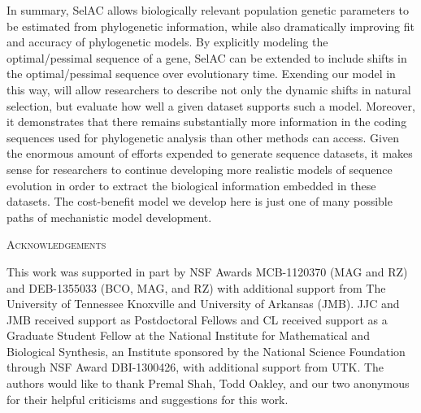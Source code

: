 \documentclass[12pt,letterpaper]{article}
\renewcommand{\section}[1]{%
\bigskip
\begin{center}
\begin{Large}
\normalfont\scshape #1
\medskip
\end{Large}
\end{center}}
\newcommand{\PC}{physico-chemical\xspace}
\newcommand{\selac}{SelAC\xspace}
\begin{document}

 

In summary, \selac allows biologically relevant population genetic parameters to be estimated from phylogenetic information, while also dramatically improving fit and accuracy of phylogenetic models. 
By explicitly modeling the optimal/pessimal sequence of a gene, \selac can be extended to include shifts in the optimal/pessimal sequence over evolutionary time.
Exending our model in this way, will allow researchers to describe not only the dynamic shifts in natural selection, but evaluate how well a given dataset supports such a model.
Moreover, it demonstrates that there remains substantially more information in the coding sequences used for phylogenetic analysis than other methods can access. 
Given the enormous amount of efforts expended to generate sequence datasets, it makes sense for researchers to continue developing more realistic models of sequence evolution in order to extract the biological information embedded in these datasets. 
The cost-benefit model we develop here is just one of many possible paths of mechanistic model development.






\section{Acknowledgements}
This work was supported in part by NSF Awards MCB-1120370 (MAG and RZ) and DEB-1355033 (BCO, MAG, and RZ) with additional support from The University of Tennessee Knoxville and University of Arkansas (JMB).
JJC and JMB received support as Postdoctoral Fellows and CL received support as a Graduate Student Fellow at the National Institute for Mathematical and Biological Synthesis, an Institute sponsored by the National Science Foundation through NSF Award DBI-1300426, with additional support from UTK.
The authors would like to thank Premal Shah, Todd Oakley, and our two anonymous  for their helpful criticisms and suggestions for this work.
\clearpage
\end{document}
